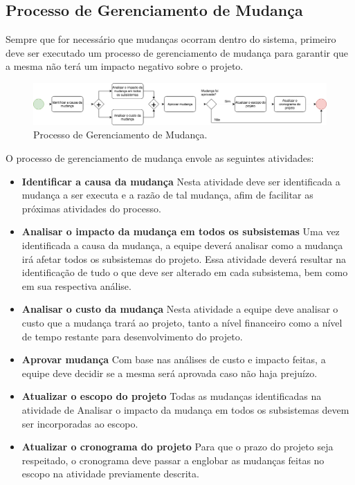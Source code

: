 \subsection{Processo de Gerenciamento de Mudança}
    Sempre que for necessário que mudanças ocorram dentro do sistema, primeiro deve ser executado um processo de gerenciamento de mudança para garantir que a mesma não terá um impacto negativo sobre o projeto.

\begin{figure}[!ht]
	\centering
		\includegraphics[scale=0.4]{figuras/mudanca}
	\caption{Processo de Gerenciamento de Mudança.}
\end{figure}

    O processo de gerenciamento de mudança envole as seguintes atividades:
\begin{itemize}
    \item \textbf{Identificar a causa da mudança}
        Nesta atividade deve ser identificada a mudança a ser executa e a razão de tal mudança, afim de facilitar as próximas atividades do processo.

    \item \textbf{Analisar o impacto da mudança em todos os subsistemas}
        Uma vez identificada a causa da mudança, a equipe deverá analisar como a mudança irá afetar todos os subsistemas do projeto. Essa atividade deverá resultar na identificação de tudo o que deve ser alterado em cada subsistema, bem como em sua respectiva análise.

    \item \textbf{Analisar o custo da mudança}
        Nesta atividade a equipe deve analisar o custo que a mudança trará ao projeto, tanto a nível financeiro como a nível de tempo restante para desenvolvimento do projeto.

    \item\textbf{Aprovar mudança}
        Com base nas análises de custo e impacto feitas, a equipe deve decidir se a mesma será aprovada caso não haja prejuízo.

    \item \textbf{Atualizar o escopo do projeto}
        Todas as mudanças identificadas na atividade de Analisar o impacto da mudança em todos os subsistemas devem ser incorporadas ao escopo.

    \item \textbf{Atualizar o cronograma do projeto}
        Para que o prazo do projeto seja respeitado, o cronograma deve passar a englobar as mudanças feitas no escopo na atividade previamente descrita.

\end{itemize}

